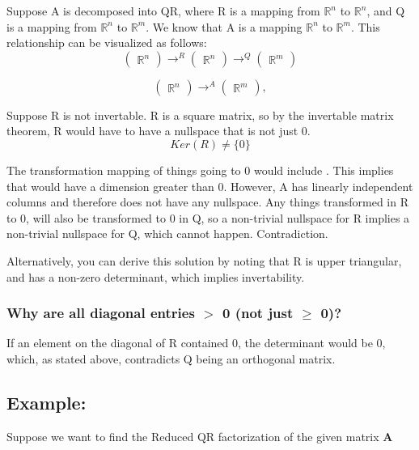 \documentclass{article}
\begin{document}
Suppose A is decomposed into QR, where R is a mapping from $\mathbb{R}^n$ to $\mathbb{R}^n$, and Q is a mapping from $\mathbb{R}^n$ to $\mathbb{R}^m$. We know that A is a mapping $\mathbb{R}^n$ to $\mathbb{R}^m$. This relationship can be visualized as follows:
$$
\begin{pmatrix}
\mathbb{R}^n
\end{pmatrix} \rightarrow^{R} \begin{pmatrix}
\mathbb{R}^n
\end{pmatrix} \rightarrow^{Q} \begin{pmatrix}
\mathbb{R}^m
\end{pmatrix} 
$$

$$
\begin{pmatrix}
\mathbb{R}^n
\end{pmatrix} \rightarrow^{A} \begin{pmatrix}
\mathbb{R}^m
\end{pmatrix},
$$

Suppose R is not invertable. R is a square matrix, so by the invertable matrix theorem, R would have to have a nullspace that is not just 0. 
$$
Ker(R) \ne \{0\}
$$

The transformation mapping of things going to 0 would include . This implies that  would have a dimension greater than 0. However, A has linearly independent columns and therefore does not have any nullspace. Any things transformed in R to 0, will also be transformed to 0 in Q, so a non-trivial nullspace for R implies a non-trivial nullspace for Q, which cannot happen. Contradiction.

Alternatively, you can derive this solution by noting that R is upper triangular, and has a non-zero determinant, which implies invertability. 


\subsubsection{Why are all diagonal entries $>$ 0 (not just $\ge$ 0)?}

If an element on the diagonal of R contained 0, the determinant would be 0, which, as stated above, contradicts Q being an orthogonal matrix.

\subsection{Example:}

Suppose we want to find the Reduced QR factorization of the given matrix \textbf{A}
\end{document}
